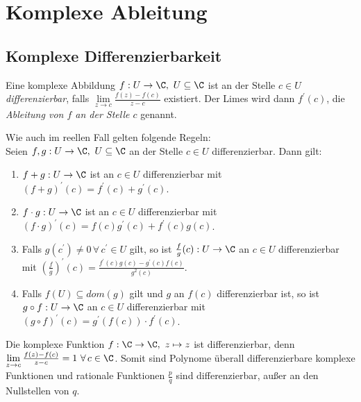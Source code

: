\chapter{Komplexe Ableitung}\lecture
	
	\section{Komplexe Differenzierbarkeit}
		
		\begin{defn}
			Eine komplexe Abbildung $ f: U \to \C,\ U \subseteq \C $ ist an der Stelle $ c \in U $ \emph{differenzierbar}, falls $ \lim\limits_{z \to c} \frac{f(z)-f(c)}{z-c} $ existiert. Der Limes wird dann $ f^\prime(c) $, die \emph{Ableitung von $f$ an der Stelle $c$} genannt.
		\end{defn}
		
		\begin{thm}
			Wie auch im reellen Fall gelten folgende Regeln:\\
			Seien $ f,g: U \to \C,\ U \subseteq \C $ an der Stelle $ c \in U $ differenzierbar. Dann gilt:
			\begin{enumerate}[label={\roman*})]
				\item $ f+g: U \to \C $ ist an $ c \in U $ differenzierbar mit $ (f+g)^\prime(c) = f^\prime(c) + g^\prime(c) $.
				\item $ f\cdot g: U \to \C $ ist an $ c \in U $ differenzierbar mit $ (f\cdot g)^\prime(c) = f(c) g^\prime(c) + f^\prime(c) g(c) $.
				\item Falls $ g(c^\prime) \neq 0\, \forall\, c^\prime \in U $ gilt, so ist $ \frac{f}{g}(c): U \to \C $ an $ c \in U $ differenzierbar mit $ \left(\frac{f}{g}\right)^\prime(c) = \frac{f^\prime(c)g(c) - g^\prime(c)f(c)}{g^2(c)} $.
				\item Falls $ f(U) \subseteq dom(g) $ gilt und $g$ an $f(c)$ differenzierbar ist, so ist $ g \circ f: U \to \C $ an $ c \in U $ differenzierbar mit $ (g\circ f)^\prime(c) = g^\prime(f(c)) \cdot f^\prime(c) $.
			\end{enumerate}
		\end{thm}
		
		\begin{exmp*}\label{exmppolyn}
			Die komplexe Funktion $ f: \C \to \C,\ z \mapsto z $ ist differenzierbar, denn $ \lim\limits_{z \to c} \frac{f(z)-f(c)}{z-c} = 1 \ \forall \, c \in \C $. Somit sind Polynome überall differenzierbare komplexe Funktionen und rationale Funktionen $ \frac{p}{q} $ sind differenzierbar, außer an den Nullstellen von $q$.
		\end{exmp*}
		
